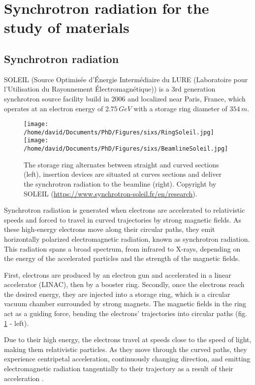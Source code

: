 \newpage
\section{Synchrotron radiation for the study of materials} \label{sec:SIXS}

\subsection{Synchrotron radiation}

SOLEIL (Source Optimisée d’Énergie Intermédiaire du LURE (Laboratoire pour l’Utilisation du Rayonnement Électromagnétique)) is a 3rd generation synchrotron source facility build in 2006 and localized near Paris, France, which operates at an electron energy of $2.75 \, GeV$ with a storage ring diameter of $354 \, m$.

\begin{figure}[!htb]
    \centering
    \texttt{[image: /home/david/Documents/PhD/Figures/sixs/RingSoleil.jpg]}
    \texttt{[image: /home/david/Documents/PhD/Figures/sixs/BeamlineSoleil.jpg]}
    \caption{
    	The storage ring alternates between straight and curved sections (left), insertion devices are situated at curves sections and deliver the synchrotron radiation to the beamline (right).
    	Copyright by SOLEIL (\url{https://www.synchrotron-soleil.fr/en/research}).
    }
    \label{fig:SOLEIL}
\end{figure}

Synchrotron radiation is generated when electrons are accelerated to relativistic speeds and forced to travel in curved trajectories by strong magnetic fields.
As these high-energy electrons move along their circular paths, they emit horizontally polarized electromagnetic radiation, known as synchrotron radiation.
This radiation spans a broad spectrum, from infrared to X-rays, depending on the energy of the accelerated particles and the strength of the magnetic fields.

First, electrons are produced by an electron gun and accelerated in a linear accelerator (LINAC), then by a booster ring.
Secondly, once the electrons reach the desired energy, they are injected into a storage ring, which is a circular vacuum chamber surrounded by strong magnets.
The magnetic fields in the ring act as a guiding force, bending the electrons' trajectories into circular paths (fig. \ref{fig:SOLEIL} - left).

Due to their high energy, the electrons travel at speeds close to the speed of light, making them relativistic particles.
As they move through the curved paths, they experience centripetal acceleration, continuously changing direction, and emitting electromagnetic radiation tangentially to their trajectory as a result of their acceleration \parencite{Willmott, NielsenMcMorrow}.


